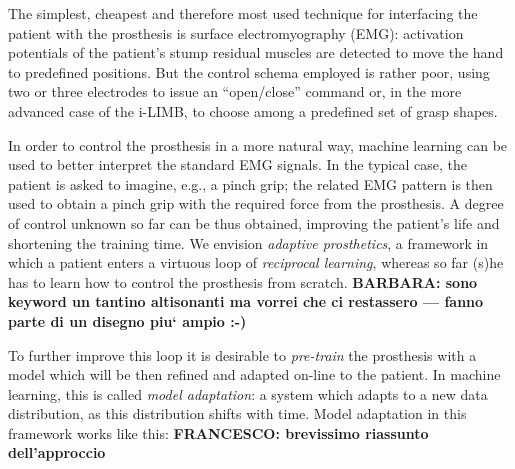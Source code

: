 The simplest, cheapest and therefore most used technique for
interfacing the patient with the prosthesis is surface
electromyography (EMG): activation potentials of the patient's stump
residual muscles are detected to move the hand to predefined
positions. But the control schema employed is rather poor, using two
or three electrodes to issue an ``open/close'' command or, in the more
advanced case of the i-LIMB, to choose among a predefined set of grasp
shapes.


In order to control the prosthesis in a more natural way, machine
learning can be used to better interpret the standard EMG signals. In
the typical case, the patient is asked to imagine, e.g., a pinch grip;
the related EMG pattern is then used to obtain a pinch grip with the
required force from the prosthesis. A degree of control unknown so far
can be thus obtained, improving the patient's life and shortening the
training time. We envision \emph{adaptive prosthetics}, a framework in
which a patient enters a virtuous loop of \emph{reciprocal learning},
whereas so far (s)he has to learn how to control the prosthesis from
scratch.
\textbf{BARBARA: sono keyword un tantino altisonanti ma vorrei che ci
restassero --- fanno parte di un disegno piu` ampio :-)}


To further improve this loop it is desirable to \emph{pre-train} the
prosthesis with a model which will be then refined and adapted on-line
to the patient. In machine learning, this is called \emph{model
adaptation}: a system which adapts to a new data distribution, as this
distribution shifts with time. Model adaptation in this framework
works like this: \textbf{FRANCESCO: brevissimo riassunto dell'approccio}

